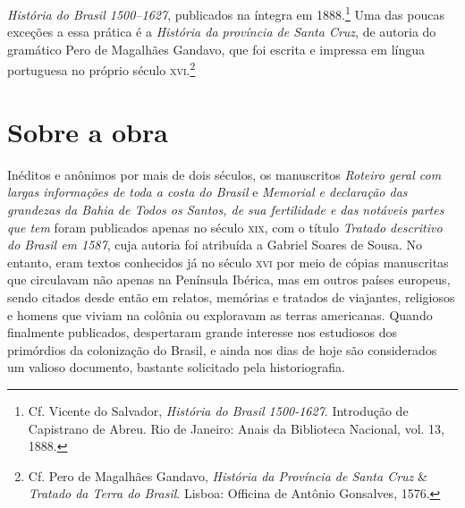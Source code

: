\textit{História do Brasil 1500--1627}, publicados na íntegra em 1888.\footnote{ Cf. Vicente do Salvador, \textit{História do Brasil 1500-1627}.
Introdução de Capistrano de Abreu. Rio de Janeiro: Anais da Biblioteca Nacional, vol. 13, 1888.}
Uma das poucas exceções a essa prática é a \textit{História da
província de Santa Cruz}, de autoria do gramático Pero de
Magalhães Gandavo, que foi escrita e impressa em língua portuguesa no
próprio século \textsc{xvi}.\footnote{ Cf. Pero de Magalhães Gandavo,
\textit{História da Província de Santa Cruz} \& \textit{Tratado da
Terra do Brasil}. Lisboa: Officina de Antônio Gonsalves, 1576.}

\section{Sobre a obra}

\noindent{}Inéditos e anônimos por mais de dois
séculos, os manuscritos \textit{\mbox{Roteiro} geral com largas informações de
toda a costa do Brasil} e \textit{Memorial e declaração das grandezas
da Bahia de Todos os Santos, de sua fertilidade e das notáveis partes
que tem} foram publicados apenas no século \textsc{xix}, com o título 
\textit{Tratado descritivo do Brasil em 1587}, cuja autoria foi atribuída a
Gabriel Soares de Sousa. No entanto, eram textos conhecidos já no
século \textsc{xvi} por meio de cópias manuscritas que circulavam não apenas na
Península Ibérica, mas em outros países europeus, sendo citados desde
então em relatos, memórias e tratados de viajantes, religiosos e homens
que viviam na colônia ou exploravam as terras americanas. Quando
finalmente publicados, despertaram grande interesse nos estudiosos dos
primórdios da colonização do Brasil, e ainda nos dias de hoje são
considerados um valioso documento, bastante solicitado pela
historiografia. %

